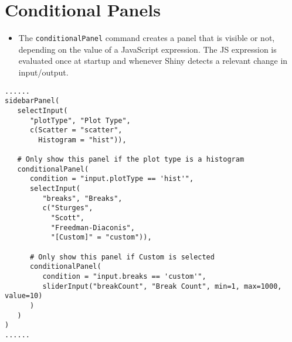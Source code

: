 \documentclass[a4paper,12pt]{article}
\begin{document}
\section*{Conditional Panels}

\begin{itemize}
\item The \texttt{conditionalPanel} command creates a panel that is visible or not, depending on the value of a JavaScript expression. The JS expression is evaluated once at startup and whenever Shiny detects a relevant change in input/output.
\end{itemize}

\begin{framed}
\begin{verbatim}
......
sidebarPanel(
   selectInput(
      "plotType", "Plot Type",
      c(Scatter = "scatter",
        Histogram = "hist")),
 
   # Only show this panel if the plot type is a histogram
   conditionalPanel(
      condition = "input.plotType == 'hist'",
      selectInput(
         "breaks", "Breaks",
         c("Sturges",
           "Scott",
           "Freedman-Diaconis",
           "[Custom]" = "custom")),
 
      # Only show this panel if Custom is selected
      conditionalPanel(
         condition = "input.breaks == 'custom'",
         sliderInput("breakCount", "Break Count", min=1, max=1000, value=10)
      )
   )
)
......
\end{verbatim}
\end{framed}
\end{document}
